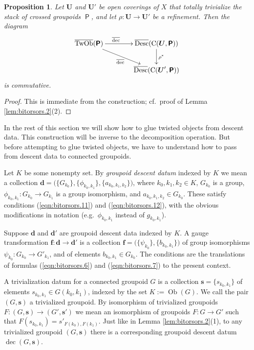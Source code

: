 \documentclass[a4paper, 10pt]{amsart}
\newtheorem{prop}[equation]{Proposition}
\theoremstyle{definition}
\numberwithin{equation}{section}
\newcommand{\opn}{\operatorname}
\newcommand{\cat}[1]{\operatorname{\mathsf{#1}}}
\newcommand{\ol}{\overline}
\newcommand{\bsym}[1]{\boldsymbol{#1}}
\newcommand{\twocat}[1]{\operatorname{\bsym{\cat{#1}}}}
\begin{document}
\begin{prop} \label{prop:bitorsors.6}
Let $\bsym{U}$ and $\bsym{U}'$ be open coverings of $X$ that totally
trivialize the stack of crossed groupoids $\twocat{P}$, and let 
$\rho : \bsym{U} \to \bsym{U}'$ be a refinement. 
Then the diagram 
\[ \UseTips \xymatrix @C=9ex @R=5ex {
\ol{\opn{TwOb}}(\twocat{P})
\ar[r]^(0.4){\ol{\opn{dec}}}
\ar[dr]_{\ol{\opn{dec}}}
&
\ol{\opn{Desc}}(\opn{C}(\bsym{U}, \twocat{P}))
\ar[d]^{\rho^*} 
\\
&
\ol{\opn{Desc}}(\opn{C}(\bsym{U}', \twocat{P})) 
} \]
is commutative.
\end{prop}

\begin{proof}
This is immediate from the construction; cf.\ proof of Lemma
\ref{lem:bitorsors.2}(2).
\end{proof}

In the rest of this section we will show how to glue twisted objects from
descent data. This construction will be inverse to the decomposition operation.
But before attempting to glue twisted objects, we have to
understand how to pass from descent data to connected groupoids. 

Let $K$ be some nonempty set. By {\em groupoid descent datum} indexed by $K$
we mean a collection 
$\bsym{d} = \bigl( \{ G_{k_0} \}, \{ \phi_{k_0, k_1} \},
\{ a_{k_0, k_1, k_2} \} \bigr)$, 
where $k_0, k_1, k_2 \in K$, $G_{k_0}$ is a group,
$\phi_{k_0, k_1} : G_{k_0} \to G_{k_1}$ is a group isomorphism, and
$a_{k_0, k_1, k_2} \in G_{k_0}$.
These satisfy conditions  (\ref{eqn:bitorsors.11})
and (\ref{eqn:bitorsors.12}), with the obvious modifications in notation (e.g.\
$\phi_{k_0, k_1}$ instead of $g_{k_0, k_1}$). 

Suppose $\bsym{d}$ and $\bsym{d}'$ are groupoid descent data indexed by $K$. 
A gauge transformation $\bsym{f} : \bsym{d} \to \bsym{d}'$ is a 
collection 
$\bsym{f} = \bigl( \{ \psi_{k_0} \}, \{ b_{k_0, k_1} \} \bigr)$
of group isomorphisms $\psi_{k_0} : G_{k_0} \to G'_{k_1}$, and of
elements $b_{k_0, k_1} \in G_{k_0}$. The conditions are the translations of
formulas (\ref{eqn:bitorsors.6}) and (\ref{eqn:bitorsors.7}) to the present
context.

A trivialization datum for a connected groupoid $G$ is a collection 
$\bsym{s} = \{  s_{k_0, k_1} \}$ of elements 
$s_{k_0, k_1} \in G(k_0, k_1)$,
indexed by the set $K := \opn{Ob}(G)$.
We call the pair $(G, \bsym{s})$ a trivialized groupoid. 
By isomorphism of trivialized groupoids 
$F : (G, \bsym{s}) \to (G', \bsym{s}')$
we mean an isomorphism of groupoids $F :G \to G'$
such that $F(s_{k_0, k_1}) = s'_{F(k_0), F(k_1)}$.
Just like in Lemma \ref{lem:bitorsors.2}(1), to any trivialized groupoid 
$(G, \bsym{s})$ there is a corresponding groupoid descent datum 
$\opn{dec}(G, \bsym{s})$.
\end{document}

